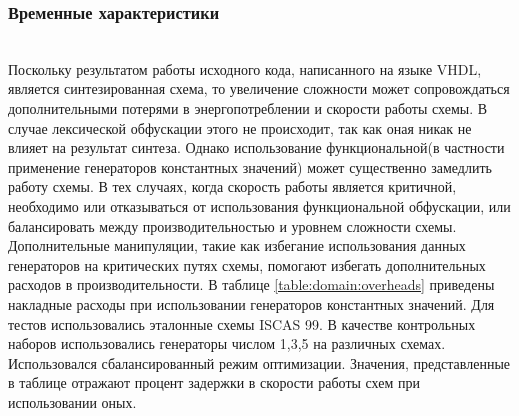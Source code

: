 \subsubsection{Временные характеристики}~\\
Поскольку результатом работы исходного кода, написанного на языке VHDL, является синтезированная схема, то увеличение сложности может сопровождаться дополнительными потерями в энергопотреблении и скорости работы схемы. В случае лексической обфускации этого не происходит, так как оная никак не влияет на результат синтеза. Однако использование функциональной(в частности применение генераторов константных значений) может существенно замедлить работу схемы. В тех случаях, когда скорость работы является критичной, необходимо или отказываться от использования функциональной обфускации, или балансировать между производительностью и уровнем сложности схемы. Дополнительные манипуляции, такие как избегание использования данных генераторов на критических путях схемы, помогают избегать дополнительных расходов в производительности. В таблице \ref{table:domain:overheads}
приведены накладные расходы при использовании генераторов константных значений. Для тестов использовались эталонные схемы ISCAS 99\cite{iscas}. В качестве контрольных наборов использовались генераторы числом 1,3,5 на различных схемах. Использовался сбалансированный режим оптимизации. Значения, представленные в таблице отражают процент задержки в скорости работы схем при использовании оных.


